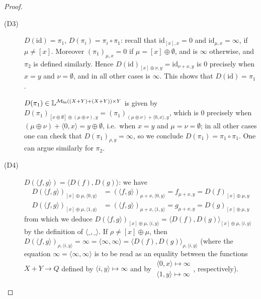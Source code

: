 \begin{proof}
\begin{description}
\item[(D3)] $D(\mathrm{id})=\pi_{1}$, $D(\pi_{i})=\pi_{i}\circ \pi_{1}$: 
recall that $\mathrm{id}_{[x],x}=0$ and $\mathrm{id}_{\mu,x}=\infty$, if $\mu\neq [x]$. 
Moreover $(\pi_{1})_{\mu,x}=0$ if $\mu=[x]\oplus \emptyset$, and is $\infty$ otherwise, and $\pi_{2}$ is defined similarly.
Hence 
$D(\mathrm{id})_{[x]\oplus\nu,y}=\mathrm{id}_{\nu+x,y}$ is $0$ precisely when $x=y$ and $\nu=\emptyset$, and in all other cases is $\infty$. This shows that $D(\mathrm{id})=\pi_{1}$. 

$D(\pi_{1})\in \mathbb{L}^{\mathcal{M}_{\mathsf{fin}}((X+Y)+(X+Y))\times Y}$ is given by
$D(\pi_{1})
_{
[x\oplus \emptyset] \oplus (\mu\oplus\nu),y
}= (\pi_{1})_{(\mu\oplus\nu)+\langle 0,x\rangle ,y }
$, 
which is 0 precisely when $(\mu\oplus\nu)+\langle 0,x\rangle= y\oplus\emptyset$, i.e.~when 
$x=y$ and $\mu=\nu=\emptyset$; in all other cases one can check that $D(\pi_{1})_{\rho,y}=\infty$, so we conclude $D(\pi_{1})=\pi_{1}\circ \pi_{1}$.
One can argue similarly for $\pi_{2}$.

\item[(D4)] $D(\langle f,g\rangle)=\langle D(f),D(g)\rangle$: 
we have
\begin{align*}
D(\langle f,g\rangle)_{[x]\oplus\mu, \langle 0,y\rangle}& = 
(\langle f,g\rangle)_{\mu+x,\langle 0,y\rangle}= f_{\mu+x,y}= D(f)_{[x]\oplus \mu,y}\\
D(\langle f,g\rangle)_{[x]\oplus\mu, \langle 1,y\rangle}& = 
(\langle f,g\rangle)_{\mu+x,\langle 1,y\rangle}= g_{\mu+x,y}= D(g)_{[x]\oplus \mu,y}
\end{align*}
from which we deduce
$D(\langle f,g\rangle)_{[x]\oplus\mu, \langle i,y\rangle}=\langle D(f),D(g)\rangle_{[x]\oplus\mu, \langle i,y\rangle}$ 
 by the definition of $\langle \_,\_\rangle$.
 If $\rho\neq [x]\oplus\mu$, then
 $D(\langle f,g\rangle)_{\rho, \langle i,y\rangle}=\infty=\langle \infty,\infty\rangle=\langle D(f),D(g)\rangle_{\rho, \langle i,y\rangle}$
 (where the equation $\infty=\langle \infty,\infty\rangle$ is to be read as an equality between the functions $ X+Y\longrightarrow Q$
 defined by $\langle i,y\rangle \mapsto \infty$ and by
 $\begin{matrix}
 \langle 0,x\rangle\mapsto\infty\\
  \langle 1,y\rangle\mapsto\infty
 \end{matrix}$, respectively).
 

\end{description}
\end{proof}
